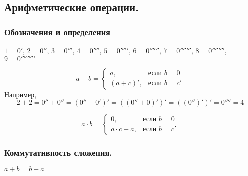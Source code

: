 \documentclass[10pt,a4paper,oneside]{article}
\begin{document}
\subsection{Арифметические операции.}

\subsubsection{Обозначения и определения}
$1 = 0'$, $2 = 0''$, $3 = 0'''$, $4 = 0''''$, $5 = 0'''''$, $6 = 0''''''$,
$7 = 0'''''''$, $8 = 0''''''''$, $9 = 0'''''''''$

\vspace{-0.3cm}
$$a + b = \left\{ \begin{array}{ll} a, & \mbox{если } b = 0\\
                                    (a + c)', & \mbox{если } b = c'
                  \end{array}\right.$$
\vspace{-0.3cm}
Например, $$2 + 2 = 0'' + 0'' = (0'' + 0')' = ((0'' + 0)')' = ((0'')')' = 0'''' = 4$$\vspace{-0.3cm}

\vspace{-0.3cm}
$$a \cdot b = \left\{ \begin{array}{ll} 0, & \mbox{если } b = 0\\
                                    a \cdot c + a, & \mbox{если } b = c'
                  \end{array}\right.$$
                  
\subsubsection{Коммутативность сложения.}
$a + b = b + a$
\end{document}
